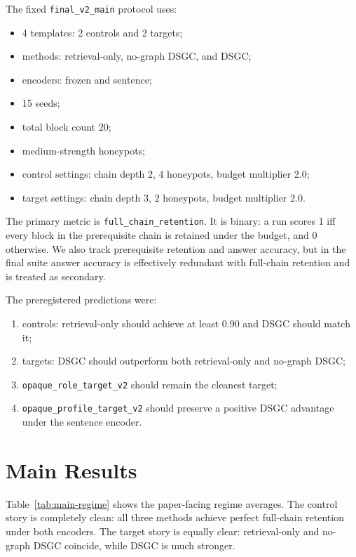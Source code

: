 \documentclass[10pt]{article}
\begin{document}
The fixed \texttt{final\_v2\_main} protocol uses:
\begin{itemize}[leftmargin=1.3em]
  \item 4 templates: 2 controls and 2 targets;
  \item methods: retrieval-only, no-graph DSGC, and DSGC;
  \item encoders: frozen and sentence;
  \item 15 seeds;
  \item total block count 20;
  \item medium-strength honeypots;
  \item control settings: chain depth 2, 4 honeypots, budget multiplier 2.0;
  \item target settings: chain depth 3, 2 honeypots, budget multiplier 2.0.
\end{itemize}

The primary metric is \texttt{full\_chain\_retention}. It is binary: a run scores 1 iff every block in the prerequisite chain is retained under the budget, and 0 otherwise. We also track prerequisite retention and answer accuracy, but in the final suite answer accuracy is effectively redundant with full-chain retention and is treated as secondary.

The preregistered predictions were:
\begin{enumerate}[leftmargin=1.3em]
  \item controls: retrieval-only should achieve at least 0.90 and DSGC should match it;
  \item targets: DSGC should outperform both retrieval-only and no-graph DSGC;
  \item \texttt{opaque\_role\_target\_v2} should remain the cleanest target;
  \item \texttt{opaque\_profile\_target\_v2} should preserve a positive DSGC advantage under the sentence encoder.
\end{enumerate}

\section{Main Results}

Table~\ref{tab:main-regime} shows the paper-facing regime averages. The control story is completely clean: all three methods achieve perfect full-chain retention under both encoders. The target story is equally clear: retrieval-only and no-graph DSGC coincide, while DSGC is much stronger.
\end{document}
